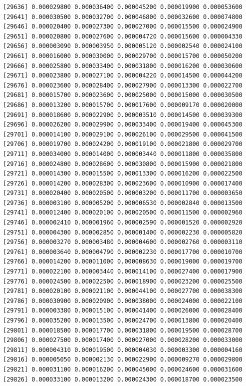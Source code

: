 \documentclass[]{article}
\begin{document}
\begin{verbatim}
[29636] 0.000029800 0.000036400 0.000045200 0.000019900 0.000053600
[29641] 0.000030500 0.000032700 0.000046800 0.000032600 0.000074800
[29646] 0.000020400 0.000027300 0.000027000 0.000015500 0.000024900
[29651] 0.000020800 0.000027600 0.000004720 0.000015600 0.000004330
[29656] 0.000003090 0.000003950 0.000005120 0.000002540 0.000024100
[29661] 0.000016000 0.000030000 0.000029700 0.000015700 0.000050200
[29666] 0.000025800 0.000033400 0.000031800 0.000016200 0.000030600
[29671] 0.000023800 0.000027100 0.000004220 0.000014500 0.000044200
[29676] 0.000023600 0.000028400 0.000027900 0.000013300 0.000022700
[29681] 0.000015700 0.000023600 0.000025000 0.000015000 0.000030500
[29686] 0.000013200 0.000015700 0.000017600 0.000009170 0.000020000
[29691] 0.000018600 0.000022900 0.000003510 0.000014500 0.000039300
[29696] 0.000026200 0.000029900 0.000033400 0.000019400 0.000045300
[29701] 0.000014100 0.000029100 0.000026100 0.000029500 0.000041500
[29706] 0.000019700 0.000024200 0.000019100 0.000021800 0.000029700
[29711] 0.000034000 0.000014000 0.000003440 0.000011800 0.000035800
[29716] 0.000024800 0.000028600 0.000030800 0.000015900 0.000021800
[29721] 0.000014300 0.000015500 0.000013300 0.000016200 0.000022500
[29726] 0.000014200 0.000028300 0.000023600 0.000010900 0.000017400
[29731] 0.000020400 0.000020500 0.000003200 0.000011700 0.000003650
[29736] 0.000003100 0.000005200 0.000006530 0.000002840 0.000013500
[29741] 0.000012400 0.000020100 0.000020500 0.000011500 0.000002960
[29746] 0.000002410 0.000001960 0.000002590 0.000001520 0.000002920
[29751] 0.000004300 0.000002850 0.000001400 0.000002230 0.000005820
[29756] 0.000003270 0.000003480 0.000004600 0.000002760 0.000003110
[29761] 0.000003640 0.000004790 0.000002230 0.000017700 0.000010700
[29766] 0.000014200 0.000011000 0.000008630 0.000019000 0.000019700
[29771] 0.000022100 0.000003440 0.000014100 0.000027400 0.000017900
[29776] 0.000024500 0.000022500 0.000018900 0.000023200 0.000025500
[29781] 0.000020100 0.000021100 0.000044100 0.000027700 0.000038300
[29786] 0.000030900 0.000020900 0.000038000 0.000024000 0.000022100
[29791] 0.000003380 0.000015100 0.000041400 0.000026000 0.000028400
[29796] 0.000035200 0.000013500 0.000024700 0.000013800 0.000020400
[29801] 0.000018500 0.000017700 0.000031800 0.000019500 0.000028700
[29806] 0.000027500 0.000017400 0.000027000 0.000028200 0.000033000
[29811] 0.000004310 0.000019500 0.000004030 0.000003300 0.000004160
[29816] 0.000005050 0.000002130 0.000022900 0.000009270 0.000029800
[29821] 0.000031100 0.000016200 0.000045000 0.000024600 0.000031600
[29826] 0.000033100 0.000013200 0.000024300 0.000018700 0.000023500

\end{verbatim}
\end{document}
